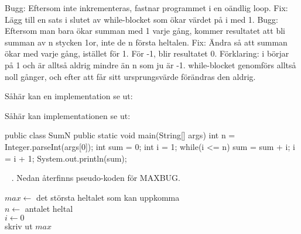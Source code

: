 \SOLUTION


\TaskSolved \what


\SubtaskSolved  Bugg: Eftersom  inte inkrementeras, fastnar programmet i en oändlig loop. Fix: Lägg till en sats i slutet av while-blocket som ökar värdet på i med 1.
Bugg: Eftersom man bara ökar summan med 1 varje gång, kommer resultatet att bli summan av n stycken 1or, inte de n första heltalen. Fix: Ändra så att summan ökar med  varje gång, istället för 1.
För -1, blir resultatet 0. Förklaring: i börjar på 1 och är alltså aldrig mindre än n som ju är -1. while-blocket genomförs alltså noll gånger, och efter att  får sitt ursprungsvärde förändras den aldrig.

Såhär kan en implementation se ut:



\SubtaskSolved {} 

Såhär kan implementationen se ut:
\begin{Code}[language=Java]
public class SumN {
  public static void main(String[] args) {
    int n = Integer.parseInt(args[0]);
    int sum = 0;
    int i = 1;
    while(i <= n){
      sum = sum + i;
      i = i + 1;
      }
    }
    System.out.println(sum);
}
\end{Code}

\QUESTEND



\clearpage

\ExtraTasks %





\QUESTBEGIN

\Task  \what~ . Nedan återfinns pseudo-koden för MAXBUG.

\begin{algorithm}[H]

 $max \leftarrow$ det största heltalet som kan uppkomma  \\
 $n \leftarrow $ antalet heltal \\
 $i \leftarrow 0$ \\
 skriv ut $max$
\end{algorithm}


